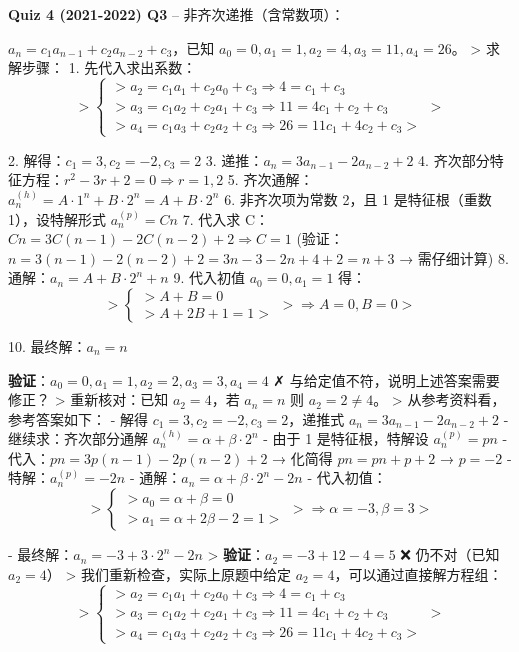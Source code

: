 \documentclass[10pt,a4paper,openany]{ctexbook}
\theoremstyle{definition}
\theoremstyle{remark}
\renewenvironment{quote}
  {\list{}{\leftmargin=1em\rightmargin=0pt\topsep=0.5pt\partopsep=0pt}\item[]}
  {\endlist}
\begin{document}
\textbf{Quiz 4 (2021-2022) Q3} -- 非齐次递推（含常数项）：
\begin{quote}
$a_n = c_1 a_{n-1} + c_2 a_{n-2} + c_3$，已知 $a_0=0, a_1=1, a_2=4, a_3=11, a_4=26$。
>
求解步骤：
1. 先代入求出系数：
\[
>    \begin{cases}
>    a_2 = c_1 a_1 + c_2 a_0 + c_3 \Rightarrow 4 = c_1 + c_3 \\
>    a_3 = c_1 a_2 + c_2 a_1 + c_3 \Rightarrow 11 = 4c_1 + c_2 + c_3 \\
>    a_4 = c_1 a_3 + c_2 a_2 + c_3 \Rightarrow 26 = 11c_1 + 4c_2 + c_3
>    \end{cases}
>    
\]

2. 解得：$c_1 = 3, c_2 = -2, c_3 = 2$
3. 递推：$a_n = 3a_{n-1} - 2a_{n-2} + 2$
4. 齐次部分特征方程：$r^2 - 3r + 2 = 0 \Rightarrow r = 1, 2$
5. 齐次通解：$a_n^{(h)} = A \cdot 1^n + B \cdot 2^n = A + B \cdot 2^n$
6. 非齐次项为常数 2，且 1 是特征根（重数 1），设特解形式 $a_n^{(p)} = Cn$
7. 代入求 C：$Cn = 3C(n-1) - 2C(n-2) + 2 \Rightarrow C = 1$
   (验证：$n = 3(n-1) - 2(n-2) + 2 = 3n-3-2n+4+2 = n+3$ → 需仔细计算)
8. 通解：$a_n = A + B \cdot 2^n + n$
9. 代入初值 $a_0=0, a_1=1$ 得：
\[
>    \begin{cases}
>    A + B = 0 \\
>    A + 2B + 1 = 1
>    \end{cases}
>    \Rightarrow A = 0, B = 0
>    
\]

10. 最终解：$a_n = n$

\textbf{验证}：$a_0=0, a_1=1, a_2=2, a_3=3, a_4=4$ ✗ 与给定值不符，说明上述答案需要修正？
>
重新核对：已知 $a_2=4$，若 $a_n=n$ 则 $a_2=2\neq 4$。
>
从参考资料看，参考答案如下：
- 解得 $c_1=3, c_2=-2, c_3=2$，递推式 $a_n = 3a_{n-1} - 2a_{n-2} + 2$
- 继续求：齐次部分通解 $a_n^{(h)} = \alpha + \beta \cdot 2^n$
- 由于 1 是特征根，特解设 $a_n^{(p)} = pn$
- 代入：$pn = 3p(n-1) - 2p(n-2) + 2$ → 化简得 $pn = pn + p + 2$ → $p = -2$
- 特解：$a_n^{(p)} = -2n$
- 通解：$a_n = \alpha + \beta \cdot 2^n - 2n$
- 代入初值：
\[
>   \begin{cases}
>   a_0 = \alpha + \beta = 0 \\
>   a_1 = \alpha + 2\beta - 2 = 1
>   \end{cases}
>   \Rightarrow \alpha = -3, \beta = 3
>   
\]

- 最终解：$a_n = -3 + 3 \cdot 2^n - 2n$
>
\textbf{验证}：$a_2 = -3 + 12 - 4 = 5$ ❌ 仍不对（已知 $a_2=4$）
>
我们重新检查，实际上原题中给定 $a_2=4$，可以通过直接解方程组：
\[
> \begin{cases}
> a_2 = c_1 a_1 + c_2 a_0 + c_3 \Rightarrow 4 = c_1 + c_3 \\
> a_3 = c_1 a_2 + c_2 a_1 + c_3 \Rightarrow 11 = 4c_1 + c_2 + c_3 \\
> a_4 = c_1 a_3 + c_2 a_2 + c_3 \Rightarrow 26 = 11c_1 + 4c_2 + c_3
> \end{cases}
> 
\]


\end{quote}
\end{document}
